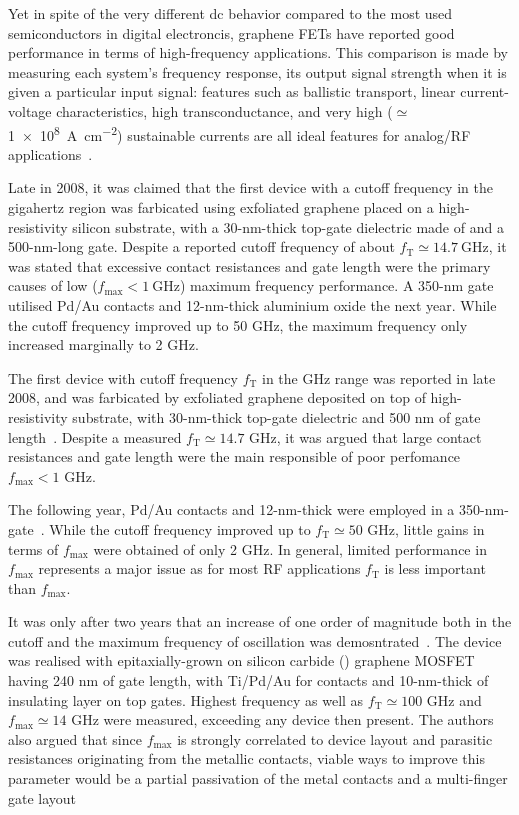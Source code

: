 Yet in spite of the very different dc behavior compared to the most used semiconductors in digital electroncis, graphene FETs have reported good performance in terms of high-frequency applications. This comparison is made by measuring each system’s frequency response, its output signal strength when it is given a particular input signal: features such as ballistic transport, linear current-voltage characteristics, high transconductance, and very high ($\simeq$ \SI{1e8}{\ampere\per\square\centi\metre}) sustainable currents are all ideal features for analog/RF applications~\cite{meric2008rf, meric2008current}.



Late in 2008, it was claimed that the first device with a cutoff frequency in the gigahertz region was farbicated using exfoliated graphene placed on a high-resistivity silicon substrate, with a 30-nm-thick top-gate dielectric made of  and a 500-nm-long gate. Despite a reported cutoff frequency of about $f_\textrm{T}\simeq\SI{14.7}{\giga\hertz}$, it was stated that excessive contact resistances and gate length were the primary causes of low ($f_\textrm{max}<\SI{1}{\giga\hertz}$) maximum frequency performance. A 350-nm gate utilised Pd/Au contacts and 12-nm-thick aluminium oxide the next year. While the cutoff frequency improved up to 50 GHz, the maximum frequency only increased marginally to 2 GHz.

The first device with cutoff frequency $f_\textrm{T}$ in the GHz range was reported in late 2008, and was farbicated by exfoliated graphene deposited on top of high-resistivity  substrate, with 30-nm-thick top-gate  dielectric and 500 nm of gate length~\cite{meric2008rf}.
Despite a measured $f_\textrm{T}\simeq 14.7$ GHz, it was argued that large contact resistances and gate length were the main responsible of poor perfomance $f_\textrm{max} < 1$ GHz.

The following year, Pd/Au contacts and 12-nm-thick  were employed in a 350-nm-gate~\cite{lin2009development}. While the cutoff frequency improved up to $f_\textrm{T}\simeq 50$ GHz, little gains in terms of $f_\textrm{max}$ were obtained of only 2 GHz. In general, limited performance in $f_\textrm{max}$
represents a major issue as for most RF applications $f_\textrm{T}$ is less important than $f_\textrm{max}$.

It was only after two years that an increase of one order of magnitude both in the cutoff and the maximum frequency of oscillation was demosntrated~\cite{lin2010100}. The device was realised with epitaxially-grown on silicon carbide () graphene \gls{MOSFET} having 240 nm of gate length, with Ti/Pd/Au for contacts and 10-nm-thick  of insulating layer on top gates. Highest frequency as well as $f_\textrm{T}\simeq 100$ GHz and $f_\textrm{max}\simeq 14$ GHz were measured,
exceeding any device then present. The authors also argued that since $f_\textrm{max}$ is strongly correlated to device layout and parasitic resistances originating from the metallic contacts, viable ways to improve this parameter would be a partial passivation of the metal contacts and a multi-finger gate layout

